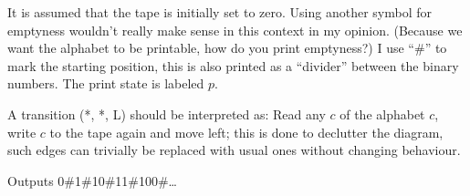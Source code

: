 \documentclass{article}
\begin{document}
It is assumed that the tape is initially set to zero. Using another symbol for emptyness wouldn't really make sense in this context in my opinion. (Because we want the alphabet to be printable, how do you print emptyness?) I use \enquote{\#} to mark the starting position, this is also printed as a \enquote{divider} between the binary numbers. The print state is labeled $p$.

A transition (*, *, L) should be interpreted as: Read any $c$ of the alphabet $c$, write $c$ to the tape again and move left; this is done to declutter the diagram, such edges can trivially be replaced with usual ones without changing behaviour.

\begin{center}
\end{center}

Outputs 0\#1\#10\#11\#100\#\ldots
\end{document}
